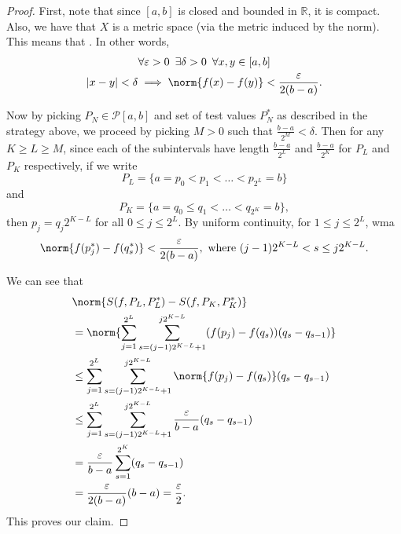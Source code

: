 \documentclass[notoc,notitlepage]{tufte-book}
\begin{document}
\begin{proof}
  First, note that since $[a, b]$ is closed and bounded in $\mathbb{R}$, it is
  compact. Also, we have that $X$ is a metric space (via the metric induced by
  the norm). This means that . In other words,
  \begin{gather*}
    \forall \epsilon > 0 \enspace \exists \delta > 0 \enspace \forall x, y \in [a, b] \\
    \abs{x - y} < \delta \implies \norm{f(x) - f(y)} < \frac{\epsilon}{2(b - a)}.
  \end{gather*}

  \noindent
  Now by picking $P_N \in \mathcal{P}[a, b]$ and set of test values $P_N^*$ as
  described in the strategy above, we proceed by picking $M > 0$ such that
  $\frac{b - a}{2^M} < \delta$. Then for any $K \geq L \geq M$, since each of
  the subintervals have length $\frac{b - a}{2^L}$ and $\frac{b - a}{2^K}$ for
  $P_L$ and $P_K$ respectively, if we write
  \begin{equation*}
    P_L = \{ a = p_0 < p_1 < \hdots < p_{2^L} = b \}
  \end{equation*}
  and
  \begin{equation*}
    P_K = \{ a = q_0 \leq q_1 < \hdots < q_{2^K} = b \},
  \end{equation*}
  then $p_j = q_j 2^{K-L}$   for all $0 \leq j \leq 2^L$. By uniform
  continuity, for $1 \leq j \leq 2^L$, wma
  \begin{equation*}
    \norm{f(p_j^*) - f(q_s^*)} < \frac{\epsilon}{2(b - a)}, \text{ where } (j-1)
    2^{K-L} < s \leq j 2^{K-L}.
  \end{equation*}

  We can see that
  \begin{align*}
    &\norm{S(f, P_L, P_L^*) - S(f, P_K, P_K^*)} \\
    &= \norm{\sum_{j=1}^{2^L} \sum_{s=(j-1)2^{K-L} + 1}^{j 2^{K-L}} 
      (f(p_j) - f(q_s))(q_s - q_{s-1})} \\
    &\leq \sum_{j=1}^{2^L} \sum_{s=(j-1) 2^{K-L} + 1}^{j 2^{K-L}}
      \norm{f(p_j) - f(q_s)} (q_s - q_{s-1}) \\
    &\leq \sum_{j=1}^{2^L} \sum_{s=(j-1) 2^{K-L} + 1}^{j 2^{K-L}}
      \frac{\epsilon}{b - a} (q_s - q_{s-1}) \\
    &= \frac{\epsilon}{b - a} \sum_{s=1}^{2^K} (q_s - q_{s-1}) \\
    &= \frac{\epsilon}{2(b - a)} (b - a) = \frac{\epsilon}{2}.
  \end{align*}
  This proves our claim.


\end{proof}
\end{document}
